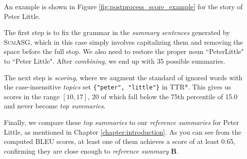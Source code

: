 An example is shown in Figure \ref{fig:postprocess_score_example} for the story of Peter Little.

The first step is to fix the grammar in the \textit{summary sentences} generated by \textsc{SumASG}, which in this case simply involves capitalizing them and removing the space before the full stop. We also need to restore the proper noun ``PeterLittle" to ``Peter Little". After \textit{combining}, we end up with 35 possible summaries.

The next step is \textit{scoring}, where we augment the standard of ignored words with the case-insensitive \textit{topics} set \texttt{\{"peter", "little"\}} in \textsc{TTR*}. This gives us scores in the range $[10,17]$, 20 of which fall below the 75th percentile of 15.0 and never become \textit{top summaries}.

Finally, we compare these \textit{top summaries} to our \textit{reference summaries} for Peter Little, as mentioned in Chapter \ref{chapter:introduction}. As you can see from the computed BLEU scores, at least one of them achieves a score of at least 0.65, confirming they are close enough to \textit{reference summary} \textbf{B}.

